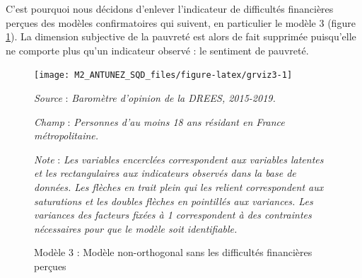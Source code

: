 \documentclass[12pt,a4paper]{reedthesis}
\begin{document}
C'est pourquoi nous décidons d'enlever l'indicateur de difficultés financières perçues des modèles confirmatoires qui suivent, en particulier le modèle 3 (figure \ref{fig:grviz3}). La dimension subjective de la pauvreté est alors de fait supprimée puisqu'elle ne comporte plus qu'un indicateur observé : le sentiment de pauvreté.
\begin{figure}[!ht]

{\centering \texttt{[image: M2\_ANTUNEZ\_SQD\_files/figure-latex/grviz3-1]} 

}

\caption[Modèle 3 ]{Modèle 3 : Modèle non-orthogonal sans les difficultés financières perçues}\label{fig:grviz3}

\footnotesize


\emph{Source} : \emph{Baromètre d’opinion de la DREES, 2015-2019.}


\emph{Champ} : \emph{Personnes d’au moins 18 ans résidant en France métropolitaine.}


\emph{Note} : \emph{Les variables encerclées correspondent aux variables latentes et les rectangulaires aux indicateurs observés dans la base de données. Les flèches en trait plein qui les relient correspondent aux saturations et les doubles flèches en pointillés aux variances. Les variances des facteurs fixées à 1 correspondent à des contraintes nécessaires pour que le modèle soit identifiable.}
\normalsize\end{figure}
\end{document}
